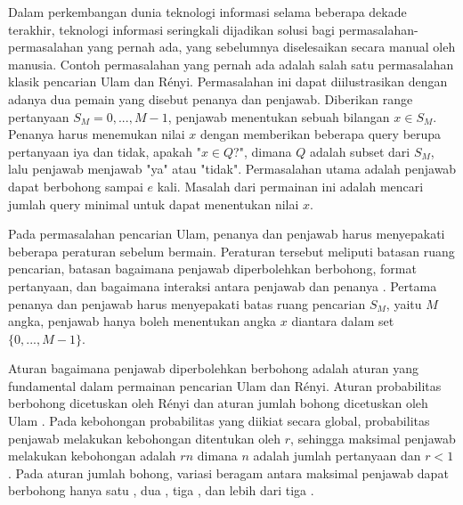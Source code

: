 \documentclass[conference,compsoc]{IEEEtran}
\begin{document}
Dalam perkembangan dunia teknologi informasi selama beberapa dekade terakhir, teknologi informasi seringkali dijadikan solusi bagi permasalahan-permasalahan yang pernah ada, yang sebelumnya diselesaikan secara manual oleh manusia. Contoh permasalahan yang pernah ada adalah salah satu permasalahan klasik pencarian Ulam dan Rényi. Permasalahan ini dapat diilustrasikan dengan adanya dua pemain yang disebut penanya dan penjawab. Diberikan range pertanyaan $S_M = {0,...,M-1}$, penjawab menentukan sebuah bilangan $x \in S_M$. Penanya harus menemukan nilai $x$ dengan memberikan beberapa query berupa pertanyaan iya dan tidak, apakah "$x \in Q$?", dimana $Q$ adalah subset dari $S_M$, lalu penjawab menjawab "ya" atau "tidak". Permasalahan utama adalah penjawab dapat berbohong sampai $e$ kali. Masalah dari permainan ini adalah mencari jumlah query minimal untuk dapat menentukan nilai $x$.


Pada permasalahan pencarian Ulam, penanya dan penjawab harus menyepakati beberapa peraturan sebelum bermain. Peraturan tersebut meliputi batasan ruang pencarian, batasan bagaimana penjawab diperbolehkan berbohong, format pertanyaan, dan bagaimana interaksi antara penjawab dan penanya \cite{Pelc2002}. Pertama penanya dan penjawab harus menyepakati batas ruang pencarian $S_M$, yaitu $M$ angka, penjawab hanya boleh menentukan angka $x$ diantara dalam set $\{0,...,M-1\}$.

Aturan bagaimana penjawab diperbolehkan berbohong adalah aturan yang fundamental dalam permainan pencarian Ulam dan Rényi. Aturan probabilitas berbohong dicetuskan oleh Rényi dan aturan jumlah bohong dicetuskan oleh Ulam \cite{Ulam1991}. Pada kebohongan probabilitas yang diikiat secara global, probabilitas penjawab melakukan kebohongan ditentukan oleh $r$, sehingga maksimal penjawab melakukan kebohongan adalah $rn$ dimana $n$ adalah jumlah pertanyaan dan $r<1$ \cite{Dhagat1992}. Pada aturan jumlah bohong, variasi beragam antara maksimal penjawab dapat berbohong hanya satu \cite{Ellis2008} \cite{Pelc1988}, dua \cite{Cicalese2000}, tiga \cite{Negro1992}, dan lebih dari tiga \cite{Berlekamp1998} \cite{Deppe2004}.
\end{document}
